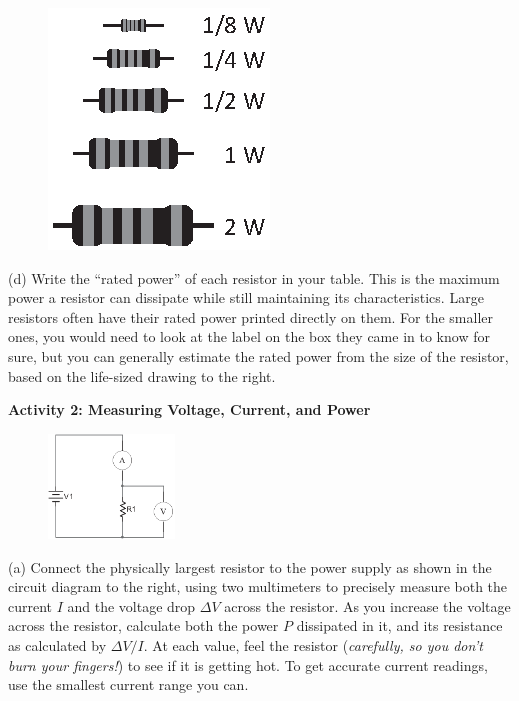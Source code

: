 \begin{figure}
    \vspace{-0.5 in}
    \includegraphics{electric_power/resistor_sizes.eps}
\end{figure}

(d) Write the ``rated power'' of each resistor in your table.  This is the maximum power a resistor can dissipate while still maintaining its characteristics.  Large resistors often have their rated power printed directly on them.  For the smaller ones, you would need to look at the label on the box they came in to know for sure, but you can generally estimate the rated power from the size of the resistor, based on the life-sized drawing to the right. 


\pagebreak
\textbf{Activity 2: Measuring Voltage, Current, and Power}

\begin{figure}
    \vspace{-0.4 in}
    \includegraphics[width=0.3\textwidth]{electric_power/circ_diagram_bw.eps}
\end{figure}

(a) Connect the physically largest resistor to the power supply as shown in the circuit diagram to the right, using two multimeters to precisely measure both the current $I$ and the voltage drop $\Delta V$ across the resistor.  As you increase the voltage across the resistor, calculate both the power $P$ dissipated in it, and its resistance as calculated by $\Delta V/I$.  At each value, feel the resistor (\textit{carefully, so you don't burn your fingers!}) to see if it is getting hot.  To get accurate current readings, use the smallest current range you can.

